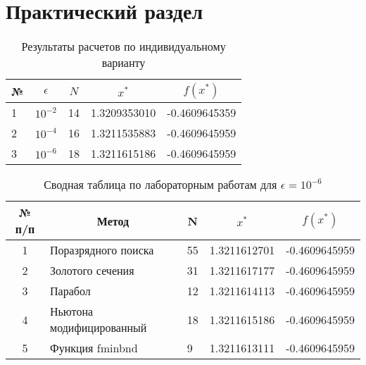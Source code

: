 \chapter{Практический раздел}


\begin{table}[h!]
    \caption{Результаты расчетов по индивидуальному варианту}
    \label{tab:results}
    \begin{tabular}{|l|l|r|r|r|}
    \hline
    \multicolumn{1}{|c|}{№} & \multicolumn{1}{c|}{\textbf{$\epsilon$}} & \multicolumn{1}{c|}{$N$} & \multicolumn{1}{c|}{\textbf{$x^{*}$}} & \multicolumn{1}{c|}{\textbf{$f(x^{*})$}} \\ \hline
    1                                & $10^{-2}$                                             & 14                              & 1.3209353010                              & -0.4609645359                               \\ \hline
    2                                & $10^{-4}$                                             & 16                              & 1.3211535883                              & -0.4609645959                                \\ \hline
    3                                & $10^{-6}$                                             & 18                              & 1.3211615186                              & -0.4609645959                                \\ \hline
    \end{tabular}
    \end{table}

\begin{table}[h!]
    \caption{Сводная таблица по лабораторным работам для $\epsilon = 10^{-6}$}
    \label{tab:results}
    \begin{tabular}{|c|l|l|l|l|}
    \hline
    № п/п & \multicolumn{1}{c|}{Метод} & \multicolumn{1}{c|}{N} & \multicolumn{1}{c|}{$x^{*}$} & \multicolumn{1}{c|}{$f(x^{*})$} \\ \hline
    1     & Поразрядного поиска        & 55                     & 1.3211612701                 & -0.4609645959                   \\ \hline
    2     & Золотого сечения           & 31                     & 1.3211617177                 & -0.4609645959                   \\ \hline
    3     & Парабол                    & 12                     & 1.3211614113                 & -0.4609645959                   \\ \hline
    4     & Ньютона модифицированный   & 18                     & 1.3211615186                 & -0.4609645959                   \\ \hline
    5     & Функция fminbnd            & 9                      & 1.3211613111                 & -0.4609645959                   \\ \hline
    \end{tabular}
    \end{table}